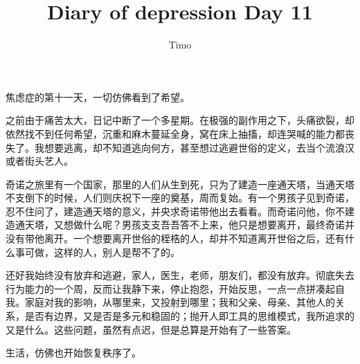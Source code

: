 \documentclass[11pt]{ctexart}
\title{Diary of depression Day 11}
\author{Timo}
\begin{document}
\maketitle

焦虑症的第十一天，一切仿佛看到了希望。\par
之前由于痛苦太大，日记中断了一个多星期。在极强的副作用之下，头痛欲裂，却依然找不到任何希望，沉重和麻木蔓延全身，窝在床上抽搐，却连哭喊的能力都丧失了。我想要逃离，却不知道逃向何方，甚至想过逃避世俗的定义，去当个流浪汉或者街头艺人。\par
奇诺之旅里有一个国家，那里的人们从生到死，只为了建造一座通天塔，当通天塔不支倒下的时候，人们则庆祝下一座的奠基，周而复始。有一个男孩子见到奇诺，忍不住问了，建造通天塔的意义，并央求奇诺带他出去看看。而奇诺问他，你不建造通天塔，又想做什么呢？男孩支支吾吾答不上来，他只是想要离开，最终奇诺并没有带他离开。一个想要离开世俗的桎梏的人，却并不知道离开世俗之后，还有什么事可做，这样的人，别人是帮不了的。\par
还好我始终没有放弃和逃避，家人，医生，老师，朋友们，都没有放弃。彻底失去行为能力的一个周，反而让我静下来，停止抱怨，开始反思，一点一点拼凑起自我。家庭对我的影响，从哪里来，又投射到哪里；我和父亲、母亲、其他人的关系，是否有边界，又是否是多元和稳固的；抛开人即工具的思维模式，我所追求的又是什么。这些问题，虽然有点迟，但是总算是开始有了一些答案。\par
生活，仿佛也开始恢复秩序了。
\end{document}
